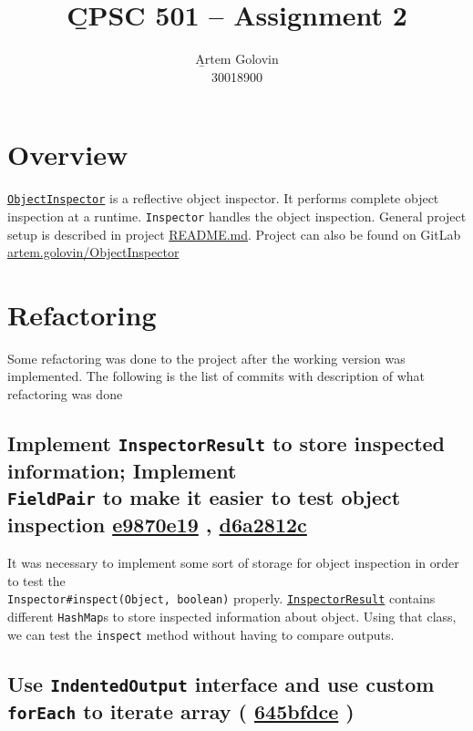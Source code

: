 \documentclass{article}
\title{\b{CPSC 501 -- Assignment 2}}
\author{\b{Artem Golovin} \\ 30018900}
\date{}
\newcommand{\code}[1]{\texttt{#1}}
\newcommand{\gh}[1]{%
  \href{https://github.com/awave1/ObjectInspector/commit/#1}{#1}%
}
\begin{document}
\maketitle

\section*{Overview}

\href{https://github.com/awave1/ObjectInspector}{\code{ObjectInspector}} is a reflective object inspector. It performs complete object inspection at a runtime. \code{Inspector} handles the object inspection. General project setup is described in project \href{https://github.com/awave1/ObjectInspector#reflective-object-inspector}{README.md}. Project can also be found on GitLab \href{https://gitlab.cpsc.ucalgary.ca/artem.golovin/ObjectInspector}{artem.golovin/ObjectInspector}

\section*{Refactoring}

Some refactoring was done to the project after the working version was implemented. The following is the list of commits with description of what refactoring was done

\subsection*{Implement \code{InspectorResult} to store inspected information; Implement \\ \code{FieldPair} to make it easier to test object inspection \gh{e9870e19}, \gh{d6a2812c}}

It was necessary to implement some sort of storage for object inspection in order to test the \\ \code{Inspector\#inspect(Object, boolean)} properly. \href{https://github.com/awave1/ObjectInspector/blob/master/src/main/java/inspector/InspectorResult.java}{\code{InspectorResult}} contains different \code{HashMap}s to store inspected information about object. Using that class, we can test the \code{inspect} method without having to compare outputs.

\subsection*{Use \code{IndentedOutput} interface and use custom \code{forEach} to iterate array (\gh{645bfdce})}
\end{document}
